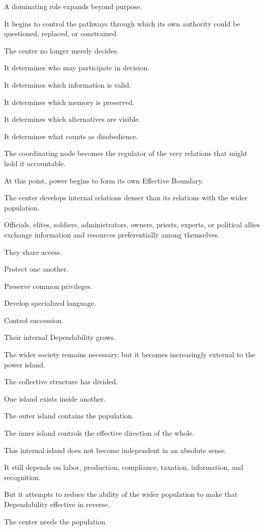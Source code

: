 A dominating role expands beyond purpose.

It begins to control the pathways through which its own authority could be questioned, replaced, or constrained.

The center no longer merely decides.

It determines who may participate in decision.

It determines which information is valid.

It determines which memory is preserved.

It determines which alternatives are visible.

It determines what counts as disobedience.

The coordinating node becomes the regulator of the very relations that might hold it accountable.

At this point, power begins to form its own Effective Boundary.

The center develops internal relations denser than its relations with the wider population.

Officials, elites, soldiers, administrators, owners, priests, experts, or political allies exchange information and resources preferentially among themselves.

They share access.

Protect one another.

Preserve common privileges.

Develop specialized language.

Control succession.

Their internal Dependability grows.

The wider society remains necessary, but it becomes increasingly external to the power island.

The collective structure has divided.

One island exists inside another.

The outer island contains the population.

The inner island controls the effective direction of the whole.

This internal island does not become independent in an absolute sense.

It still depends on labor, production, compliance, taxation, information, and recognition.

But it attempts to reduce the ability of the wider population to make that Dependability effective in reverse.

The center needs the population.

